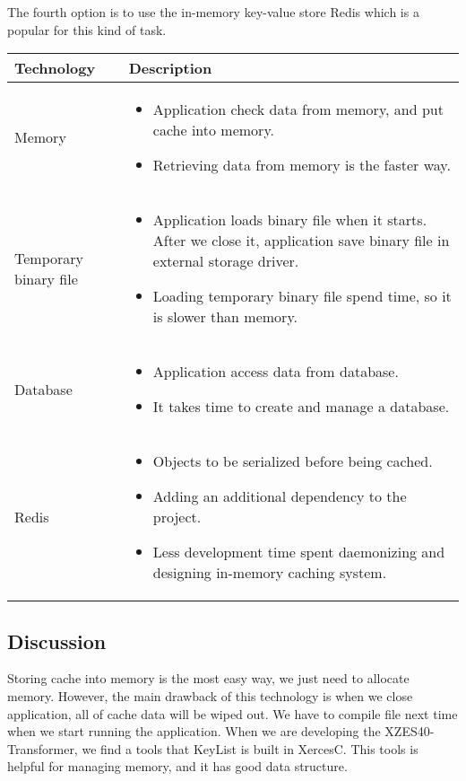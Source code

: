 The fourth option is to use the in-memory key-value store Redis \cite{redis} which is a popular for this kind of task.

\begin{center}
    \begin{tabular}{ | l | p{10cm} |}
    \hline
    Technology & Description  \\ \hline
    Memory&
    \begin{itemize}
      \item Application check data from memory, and put cache into memory.
      \item Retrieving data from memory is the faster way.
    \end{itemize}\\ \hline
    Temporary binary file&
    \begin{itemize}
      \item Application loads binary file when it starts. After we close it, application save binary file in external storage driver.
      \item Loading temporary binary file spend time, so it is slower than memory.
    \end{itemize}\\ \hline
    Database &
    \begin{itemize}
      \item Application access data from database.
      \item It takes time to create and manage a database.
    \end{itemize}\\ \hline
    Redis &
    \begin{itemize}
      \item Objects to be serialized before being cached.
      \item Adding an additional dependency to the project.
      \item Less development time spent daemonizing and designing in-memory caching system.
    \end{itemize}\\ \hline
    \end{tabular}
\end{center}

\subsection{Discussion}

Storing cache into memory is the most easy way, we just need to allocate memory.
However, the main drawback of this technology is when we close application, all of cache data will be wiped out.
We have to compile file next time when we start running the application.
When we are developing the XZES40-Transformer, we find a tools that KeyList is built in XercesC.
This tools is helpful for managing memory, and it has good data structure.

